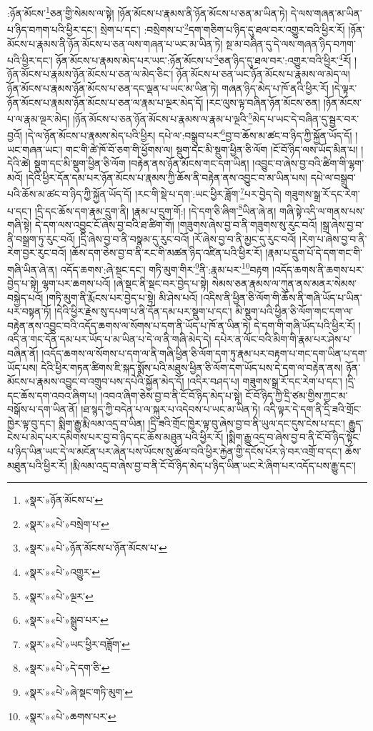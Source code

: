 :ཉོན་མོངས་\footnote{«སྣར་»ཉོན་མོངས་པ་}ཅན་གྱི་སེམས་ལ་སྟེ། །ཉོན་མོངས་པ་རྣམས་ནི་ཉོན་མོངས་པ་ཅན་མ་ཡིན་ཏེ། དེ་ལས་གཞན་མ་ཡིན་པ་ཉིད་བཀག་པའི་ཕྱིར་དང་། སྲེག་པ་དང་། :བསྲེགས་པ་\footnote{«སྣར་»«པེ་»བསྲེག་པ་}དག་གཅིག་པ་ཉིད་དུ་ཐལ་བར་འགྱུར་བའི་ཕྱིར་རོ། །ཉོན་མོངས་པ་རྣམས་ནི་ཉོན་མོངས་པ་ཅན་ལས་གཞན་པ་ཡང་མ་ཡིན་ཏེ། སྔ་མ་བཞིན་དུ་དེ་ལས་གཞན་ཉིད་བཀག་པའི་ཕྱིར་དང་། ཉོན་མོངས་པ་རྣམས་མེད་པར་ཡང་:ཉོན་མོངས་པ་\footnote{«སྣར་»«པེ་»ཉོན་མོངས་པ་ཉོན་མོངས་པ་}ཅན་ཉིད་དུ་ཐལ་བར་:འགྱུར་བའི་ཕྱིར་\footnote{«སྣར་»«པེ་»འགྱུར་}རོ། །ཉོན་མོངས་པ་རྣམས་ཉོན་མོངས་པ་ཅན་ལ་མེད་ཅིང་། ཉོན་མོངས་པ་ཅན་ཡང་ཉོན་མོངས་པ་རྣམས་ལ་མེད་ལ། ཉོན་མོངས་པ་རྣམས་ཉོན་མོངས་པ་ཅན་དང་ལྡན་པ་ཡང་མ་ཡིན་ཏེ། གཞན་ཉིད་མེད་པ་ཁོ་ནའི་ཕྱིར་རོ། །དེ་ལྟར་ཉོན་མོངས་པ་རྣམས་ཉོན་མོངས་པ་ཅན་ལ་རྣམ་པ་ལྔར་མེད་དོ། །རང་ལུས་ལྟ་བཞིན་ཉོན་མོངས་ཅན། །ཉོན་མོངས་པ་ལ་རྣམ་ལྔར་མེད། །ཉོན་མོངས་པ་ཅན་ཉོན་མོངས་པ་རྣམས་ལ་རྣམ་པ་ལྔའི་\footnote{«སྣར་»«པེ་»ལྔར་}མེད་པ་ཡང་དེ་བཞིན་དུ་སྦྱར་བར་བྱའོ། །དེ་ལ་ཉོན་མོངས་པ་རྣམས་མེད་པའི་ཕྱིར། དཔེ་ལ་:བསྒྲུབ་པར་\footnote{«སྣར་»«པེ་»སྒྲུབ་པར་}བྱ་བ་ཆོས་མ་ཚང་བ་ཉིད་ཀྱི་སྐྱོན་ཡོད་དོ། །ཡང་གཞན་ཡང་། གང་གི་ཚེ་ཁོ་བོ་ཅག་གི་ཕྱོགས་ལ། སྡུག་དང་མི་སྡུག་ཕྱིན་ཅི་ལོག །ངོ་བོ་ཉིད་ལས་ཡོད་མིན་པ། །དེའི་ཚེ། སྡུག་དང་མི་སྡུག་ཕྱིན་ཅི་ལོག །བརྟེན་ནས་ཉོན་མོངས་གང་དག་ཡིན། །འབྱུང་བ་ཞེས་བྱ་བའི་ཚིག་གི་ལྷག་མའོ། །དེའི་ཕྱིར་དོན་དམ་པར་ཉོན་མོངས་པ་རྣམས་ཀྱི་ཆོས་ནི་བརྟེན་ནས་འབྱུང་བ་མ་ཡིན་པས། དཔེ་ལ་བསྒྲུབ་པའི་ཆོས་མ་ཚང་བ་ཉིད་ཀྱི་སྐྱོན་ཡོད་དོ། །རང་གི་སྡེ་པ་དག་:ཡང་ཕྱིར་ཟློག་\footnote{«སྣར་»«པེ་»ཡང་ཕྱིར་བཟློག་}པར་བྱེད་དེ། གཟུགས་སྒྲ་རོ་དང་རེག་པ་དང་། །དྲི་དང་ཆོས་དག་རྣམ་དྲུག་ནི། །རྣམ་པ་དྲུག་གོ:། །དེ་དག་ཅི་ཞིག་\footnote{«སྣར་»«པེ་»དེ་དག་ཅི་}ཡིན་ཞེ་ན། གཞི་སྟེ་འདི་ལ་གནས་པས་གཞི་སྟེ། དེ་དག་ལས་འབྱུང་ངོ་ཞེས་བྱ་བའི་ཐ་ཚིག་གོ། །གཟུགས་ཞེས་བྱ་བ་ནི་གཟུགས་སུ་རུང་བའོ། །སྒྲ་ཞེས་བྱ་བ་ནི་བསྒྲག་ཏུ་རུང་བའོ། །དྲི་ཞེས་བྱ་བ་ནི་བསྣམ་དུ་རུང་བའོ། །རོ་ཞེས་བྱ་བ་ནི་མྱང་དུ་རུང་བའོ། །རེག་པ་ཞེས་བྱ་བ་ནི་རེག་བྱར་རུང་བའོ། །ཆོས་དག་ཅེས་བྱ་བ་ནི་རང་གི་མཚན་ཉིད་འཛིན་པའི་ཕྱིར་རོ། །རྣམ་པ་དྲུག་པོ་དེ་དག་གང་གི་གཞི་ཡིན་ཞེ་ན། འདོད་ཆགས་:ཞེ་སྡང་དང་། གཏི་མུག་གིར་\footnote{«སྣར་»«པེ་»ཞེ་སྡང་གཏི་མུག་}ནི་:རྣམ་པར་\footnote{«སྣར་»«པེ་»ཆགས་པར་}བརྟག །འདོད་ཆགས་ནི་ཆགས་པར་བྱེད་པ་སྟེ། ལྷག་པར་ཆགས་པའོ། །ཞེ་སྡང་ནི་སྡང་བར་བྱེད་པ་སྟེ། སེམས་ཅན་རྣམས་ལ་ཀུན་ནས་མནར་སེམས་བསྐྱེད་པའོ། །གཏི་མུག་ནི་རྨོངས་པར་བྱེད་པ་སྟེ། མི་ཤེས་པའོ། །འདིས་ནི་ཕྱིན་ཅི་ལོག་གི་ཆོས་ནི་གཞི་ཡོད་པ་ཡིན་པར་བསྟན་ཏོ། །དེའི་ཕྱིར་རྗེས་སུ་དཔག་པ་ནི་དོན་དམ་པར་སྡུག་པ་དང་། མི་སྡུག་པའི་ཕྱིན་ཅི་ལོག་གང་དག་ལ་བརྟེན་ནས་འབྱུང་བའི་འདོད་ཆགས་ལ་སོགས་པ་དག་ནི་ཡོད་པ་ཁོ་ན་ཡིན་ཏེ། དེ་དག་གི་གཞི་ཡོད་པའི་ཕྱིར་རོ། །འདི་ན་གང་དོན་དམ་པར་ཡོད་པ་མ་ཡིན་པ་དེ་ལ་ནི་གཞི་མེད་དེ། དཔེར་ན་ལོང་བའི་མིག་གི་རྣམ་པར་ཤེས་པ་བཞིན་ནོ། །འདོད་ཆགས་ལ་སོགས་པ་དག་ལ་ནི་གཞི་ཕྱིན་ཅི་ལོག་དག་ཏུ་རྣམ་པར་བརྟག་པ་གང་དག་ཡིན་པ་དག་ཡོད་པས། དེའི་ཕྱིར་གཏན་ཚིགས་ཇི་སྐད་སྨོས་པའི་མཐུས་ཕྱིན་ཅི་ལོག་དག་ཡོད་པས་དེ་དག་ལ་བརྟེན་ནས། ཉོན་མོངས་པ་རྣམས་འབྱུང་བ་འགྲུབ་པས་དཔེའི་སྐྱོན་མེད་དོ། །འདིར་བཤད་པ། གཟུགས་སྒྲ་རོ་དང་རེག་པ་དང་། །དྲི་དང་ཆོས་དག་འབའ་ཞིག་པ། །འབའ་ཞིག་ཅེས་བྱ་བ་ནི་ངོ་བོ་ཉིད་མེད་པ་སྟེ། ངོ་བོ་ཉིད་ཀྱི་དྲི་ཙམ་གྱིས་ཀྱང་མ་བསྒོས་པ་དག་ཡིན་ནོ། །ཐ་སྙད་ཀྱི་བདེན་པ་ལ་སྐུར་པ་འདེབས་པ་ཡང་མ་ཡིན་ཏེ། འདི་ལྟར་དེ་དག་ནི་དྲི་ཟའི་གྲོང་ཁྱེར་ལྟ་བུ་དང་། སྨིག་རྒྱུ་རྨི་ལམ་འདྲ་བ་ཡིན། །དྲི་ཟའི་གྲོང་ཁྱེར་ལྟ་བུ་ཞེས་བྱ་བ་ནི་ཡུལ་དང་དུས་ངེས་པ་དང་། རྒྱུད་ངེས་པ་མེད་པར་དམིགས་པར་བྱ་བ་ཉིད་དང་ཆོས་མཐུན་པའི་ཕྱིར་རོ། །སྨིག་རྒྱུ་འདྲ་བ་ཞེས་བྱ་བ་ནི་ངོ་བོ་ཉིད་སྟོང་པ་ཉིད་ཡིན་ཡང་དེ་ལ་མངོན་པར་ཞེན་པས་ཡོངས་སུ་ཚོལ་བའི་ཕྱིར་རྐྱེན་གྱི་དངོས་པོར་ཉེ་བར་འགྲོ་བ་དང་། ཆོས་མཐུན་པའི་ཕྱིར་རོ། །རྨི་ལམ་འདྲ་བ་ཞེས་བྱ་བ་ནི་ངོ་བོ་ཉིད་མེད་པ་ཉིད་ཡིན་ཡང་རེ་ཞིག་པར་འདོད་པས་རྒྱུ་དང་། 